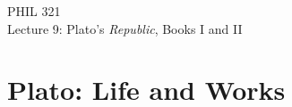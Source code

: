 \documentclass[11pt]{article}
\begin{document}
\thispagestyle{empty}
\begin{center} \LARGE{PHIL 321\\ Lecture 9: Plato's \emph{Republic}, Books I and II}\\ \vspace*{2mm}
\end{center}
\thispagestyle{empty}\vspace*{3mm}
\vspace*{-8mm}

\section*{Plato: Life and Works}
\end{document}
